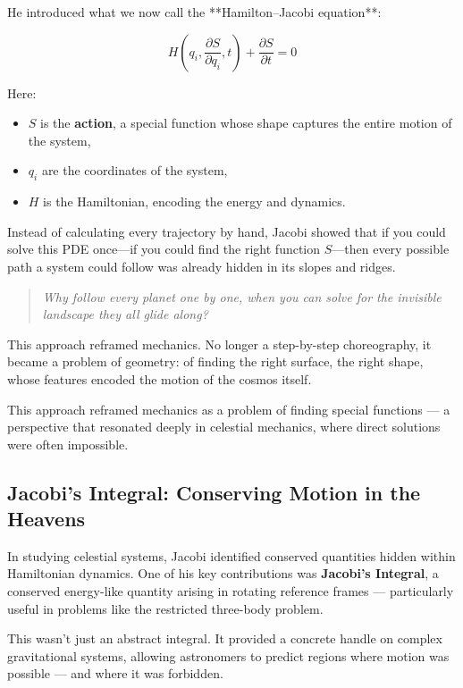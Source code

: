 He introduced what we now call the **Hamilton–Jacobi equation**:

\[
H\left(q_i, \frac{\partial S}{\partial q_i}, t\right) + \frac{\partial S}{\partial t} = 0
\]

Here:
\begin{itemize}
  \item \( S \) is the \textbf{action}, a special function whose shape captures the entire motion of the system,
  \item \( q_i \) are the coordinates of the system,
  \item \( H \) is the Hamiltonian, encoding the energy and dynamics.
\end{itemize}

Instead of calculating every trajectory by hand, Jacobi showed that if you could solve this PDE once—if you could find the right function \( S \)—then every possible path a system could follow was already hidden in its slopes and ridges.

\begin{quote}
\textit{Why follow every planet one by one,  
when you can solve for the invisible landscape they all glide along?}
\end{quote}

This approach reframed mechanics. No longer a step-by-step choreography, it became a problem of geometry: of finding the right surface, the right shape, whose features encoded the motion of the cosmos itself.

This approach reframed mechanics as a problem of finding special functions — a perspective that resonated deeply in celestial mechanics, where direct solutions were often impossible.

\subsection{Jacobi’s Integral: Conserving Motion in the Heavens}

In studying celestial systems, Jacobi identified conserved quantities hidden within Hamiltonian dynamics. One of his key contributions was \textbf{Jacobi’s Integral}, a conserved energy-like quantity arising in rotating reference frames — particularly useful in problems like the restricted three-body problem.

This wasn’t just an abstract integral. It provided a concrete handle on complex gravitational systems, allowing astronomers to predict regions where motion was possible — and where it was forbidden.


